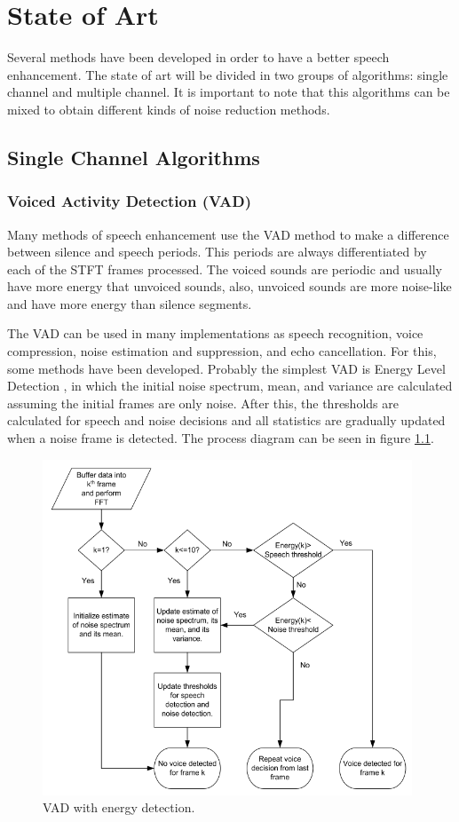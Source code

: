 \chapter{State of Art}

Several methods have been developed in order to have a better speech enhancement. The state of art will be divided in two groups of algorithms: single channel and multiple channel. It is important to note that this algorithms can be mixed to obtain different kinds of noise reduction methods.

\section{Single Channel Algorithms}

\subsection{Voiced Activity Detection (VAD)}

Many methods of speech enhancement use the VAD method to make a difference between silence and speech periods. This periods are always differentiated by each of the STFT frames processed. The voiced sounds are periodic and usually have more energy that unvoiced sounds, also, unvoiced sounds are more noise-like and have more energy than silence segments.

The VAD can be used in many implementations as speech recognition, voice compression, noise estimation and suppression, and echo cancellation. For this, some methods have been developed. 
Probably the simplest VAD is Energy Level Detection \cite{Faneuff2002SpatialCar}, in which the initial noise spectrum, mean, and variance are calculated assuming the initial frames are only noise. After this, the thresholds are calculated for speech and noise decisions and all statistics are gradually updated when a noise frame is detected. The process diagram can be seen in figure \ref{fig:VADener}.

\begin{figure}[!ht]
  \center
	\includegraphics[width=110mm]{State_of_Art/VADener}
	\caption{VAD with energy detection\cite{Faneuff2002SpatialCar}.}
	\label{fig:VADener}
\end{figure}

